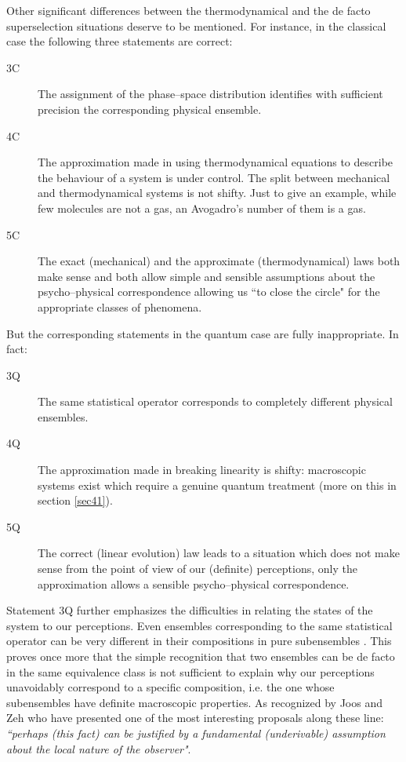 \documentclass[10pt,a4paper]{article}
\begin{document}
Other significant differences between the thermodynamical and the
de facto superselection situations deserve to be mentioned. For
instance, in the classical case the following three statements are
correct:
\begin{description}
\item[3C] The assignment of the phase--space distribution identifies
with sufficient precision the corresponding physical ensemble.
\item[4C] The approximation made in using thermodynamical equations
to describe the behaviour of a system is under control. The split
between mechanical and thermodynamical systems is not shifty. Just
to give an example, while few molecules are not a gas, an
Avogadro's number of them is a gas.
\item[5C] The exact (mechanical) and the approximate
(thermodynamical) laws both make sense and both allow simple and
sensible assumptions about the psycho--physical correspondence
allowing us ``to close the circle" for the appropriate classes of
phenomena.
\end{description}
But the corresponding statements in the quantum case are fully
inappropriate. In fact:
\begin{description}
\item[3Q] The same statistical operator corresponds to completely
different physical ensembles.
\item[4Q] The approximation made in breaking linearity is shifty:
macroscopic systems exist which require a genuine quantum
treatment (more on this in section \ref{sec41}).
\item[5Q] The correct (linear evolution) law leads to a situation
which does not make sense from the point of view of our (definite)
perceptions, only the approximation allows a sensible
psycho--physical correspondence.
\end{description}
Statement 3Q further emphasizes the difficulties in relating the
states of the system to our perceptions. Even ensembles
corresponding to the same statistical operator can be very
different in their compositions in pure subensembles \cite{bcas}.
This proves once more that the simple recognition that two
ensembles can be de facto in the same equivalence class is not
sufficient to explain why our perceptions unavoidably correspond
to a specific composition, i.e. the one whose subensembles have
definite macroscopic properties. As recognized by Joos and Zeh
\cite{jz} who have presented one of the most interesting proposals
along these line: {\it ``perhaps (this fact) can be justified by a
fundamental (underivable) assumption about the local nature of the
observer"}.
\end{document}
